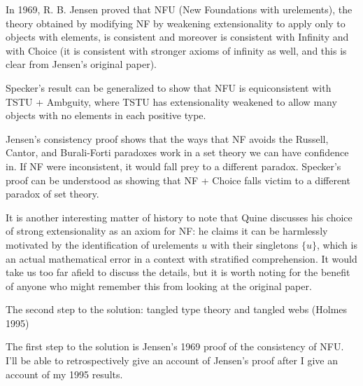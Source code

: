 \documentclass{slides}
\begin{document}
\begin{slide}

In 1969, R. B. Jensen proved that NFU (New Foundations with urelements), the theory obtained by modifying NF by weakening extensionality to apply only to objects with elements,
is consistent and moreover is consistent with Infinity and with Choice (it is consistent with stronger axioms of infinity as well, and this is clear from Jensen's original paper).

Specker's result can be generalized to show that NFU is equiconsistent with TSTU + Ambguity, where TSTU has extensionality weakened to allow many objects with no elements in each positive type.

Jensen's consistency proof shows that the ways that NF avoids the Russell, Cantor, and Burali-Forti paradoxes work in a set theory we can have confidence in.  If NF were inconsistent, it would fall prey to a different paradox.  Specker's proof can be understood as showing that NF + Choice falls victim to a different paradox of set theory.


\end{slide}

\begin{slide}

It is another interesting matter of history to note that Quine discusses his choice of strong extensionality as an axiom for NF:  he claims it can be harmlessly motivated by the identification of 
urelements $u$ with their singletons $\{u\}$, which is an actual mathematical error in a context with stratified comprehension.  It would take us too far afield to discuss the details, but it is worth noting for the benefit of anyone who might remember this from looking at the original paper.

\end{slide}

\begin{slide}

{\Large The second step to the solution:  tangled type theory and tangled webs (Holmes 1995)}

The first step to the solution is Jensen's 1969 proof of the consistency of NFU.  I'll be able to retrospectively give an account of Jensen's proof after I give an account of my 1995 results.

\end{slide}
\end{document}
